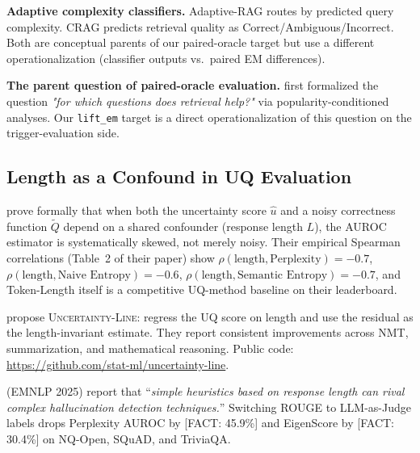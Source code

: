 \documentclass[11pt]{article}
\newcommand{\FACT}[1]{{\color{blue}\textsf{[FACT: #1]}}}
\begin{document}
\noindent\textbf{Adaptive complexity classifiers.} Adaptive-RAG
\citep{Jeong_AdaptiveRAG} routes by predicted query complexity. CRAG
\citep{Yan_CorrectiveRAG} predicts retrieval quality as Correct/Ambiguous/Incorrect.
Both are conceptual parents of our paired-oracle target but use a different
operationalization (classifier outputs vs.\ paired EM differences).

\noindent\textbf{The parent question of paired-oracle evaluation.}
\cite{Mallen_WhenNotToTrustLMs} first formalized the question \emph{"for
which questions does retrieval help?"} via popularity-conditioned analyses.
Our \texttt{lift\_em} target is a direct operationalization of this question
on the trigger-evaluation side.

\subsection{Length as a Confound in UQ Evaluation}
\label{sec:related-length-confound}

\cite{Santilli_RevisitingUQEvaluationLengthBias} prove formally that when both
the uncertainty score $\hat{u}$ and a noisy correctness function $\tilde{Q}$
depend on a shared confounder (response length $L$), the AUROC estimator is
systematically skewed, not merely noisy. Their empirical Spearman correlations
(Table~2 of their paper) show
$\rho(\text{length}, \text{Perplexity}) = -0.7$,
$\rho(\text{length}, \text{Naive Entropy}) = -0.6$,
$\rho(\text{length}, \text{Semantic Entropy}) = -0.7$, and Token-Length
itself is a competitive UQ-method baseline on their leaderboard.

\cite{Vashurin_UncertaintyLineLengthInvariant} propose \textsc{Uncertainty-Line}:
regress the UQ score on length and use the residual as the length-invariant
estimate. They report consistent improvements across NMT, summarization, and
mathematical reasoning. Public code:
\url{https://github.com/stat-ml/uncertainty-line}.

\cite{Janiak_IllusionProgressHallucinationDetection} (EMNLP 2025) report that
``\textit{simple heuristics based on response length can rival complex
hallucination detection techniques.}'' Switching ROUGE to LLM-as-Judge labels
drops Perplexity AUROC by \FACT{45.9\%} and EigenScore by \FACT{30.4\%} on
NQ-Open, SQuAD, and TriviaQA.
\end{document}

